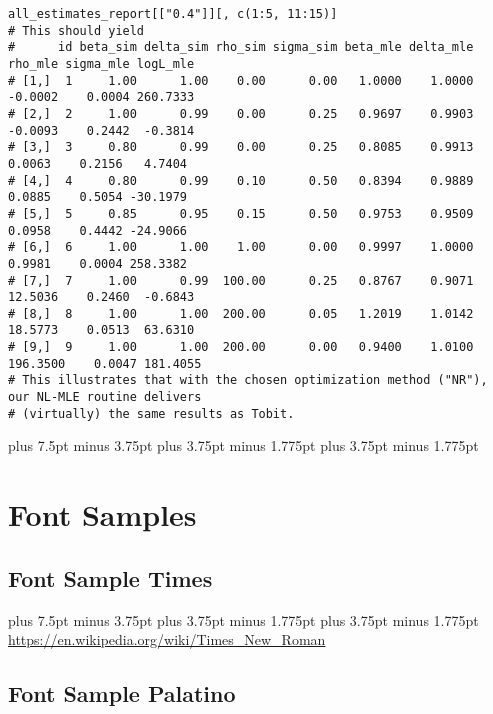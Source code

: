 \documentclass[12pt, a4paper, oneside]{article}
\newlength{\baselinedist}
\newlength{\fsnormal}
\let \normalsizeOrig \normalsize
\def\normalsize{%
		\normalsizeOrig%
		\fontsize{\fsnormal}{\baselinedist}\selectfont%
		\abovedisplayskip 13.5pt plus 6.75pt minus 3.375pt%
		\belowdisplayskip \abovedisplayskip%
		\abovedisplayshortskip 6.75pt plus 3.375pt minus 1.6875pt%
		\belowdisplayshortskip 6.75pt plus 3.375pt minus 1.6875pt%
	}
\def\normalsize{%
		\normalsizeOrig%
		\fontsize{\fsnormal}{\baselinedist}\selectfont%
		\abovedisplayskip 15pt plus 7.5pt minus 3.75pt%
		\belowdisplayskip \abovedisplayskip%
		\abovedisplayshortskip 7.5pt plus 3.75pt minus 1.775pt%
		\belowdisplayshortskip 7.5pt plus 3.75pt minus 1.775pt%
	}
\theoremstyle{Plain}
\theoremstyle{Definition}
\theoremstyle{Remark}
\begin{document}
\begin{appendix}
\begin{lstlisting}
all_estimates_report[["0.4"]][, c(1:5, 11:15)]
# This should yield
#      id beta_sim delta_sim rho_sim sigma_sim beta_mle delta_mle  rho_mle sigma_mle logL_mle
# [1,]  1     1.00      1.00    0.00      0.00   1.0000    1.0000  -0.0002    0.0004 260.7333
# [2,]  2     1.00      0.99    0.00      0.25   0.9697    0.9903  -0.0093    0.2442  -0.3814
# [3,]  3     0.80      0.99    0.00      0.25   0.8085    0.9913   0.0063    0.2156   4.7404
# [4,]  4     0.80      0.99    0.10      0.50   0.8394    0.9889   0.0885    0.5054 -30.1979
# [5,]  5     0.85      0.95    0.15      0.50   0.9753    0.9509   0.0958    0.4442 -24.9066
# [6,]  6     1.00      1.00    1.00      0.00   0.9997    1.0000   0.9981    0.0004 258.3382
# [7,]  7     1.00      0.99  100.00      0.25   0.8767    0.9071  12.5036    0.2460  -0.6843
# [8,]  8     1.00      1.00  200.00      0.05   1.2019    1.0142  18.5773    0.0513  63.6310
# [9,]  9     1.00      1.00  200.00      0.00   0.9400    1.0100 196.3500    0.0047 181.4055
# This illustrates that with the chosen optimization method ("NR"), our NL-MLE routine delivers
# (virtually) the same results as Tobit.
\end{lstlisting}

\clearpage

\begingroup

\normalsize

\section{Font Samples}
\label{app:font-samples}

\subsection[Font Sample Times]{Font Sample Times}
\label{app:font-samples:times}

\begin{otherlanguage}{ngerman}\noindent\normalsize%
	\makeatletter%
	\ifdim \f@size pt < 11.5pt%
		\fontsize{11pt}{\baselinedist}%
	\else%
		\fontsize{12pt}{\baselinedist}%
	\fi%
	\makeatother%
	\selectfont%
	\Kafka
	\medskip
	\noindent\url{https://en.wikipedia.org/wiki/Times_New_Roman} \par
\end{otherlanguage}

\subsection[Font Sample Palatino]{\selectfont Font Sample Palatino}
\label{app:font-samples:palatino}


\end{appendix}
\end{document}
